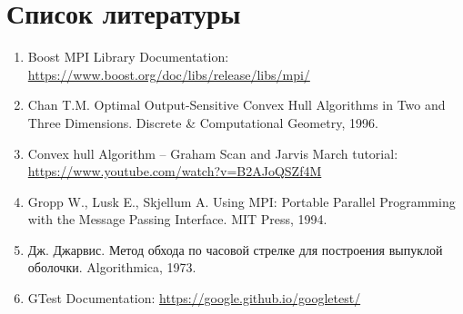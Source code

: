 \documentclass[a4paper,12pt]{article}
\begin{document}
\newpage

\section{Список литературы}
\begin{enumerate}
    \item Boost MPI Library Documentation: \url{https://www.boost.org/doc/libs/release/libs/mpi/}
    \item Chan T.M. Optimal Output-Sensitive Convex Hull Algorithms in Two and Three Dimensions. Discrete \& Computational Geometry, 1996.
    \item Convex hull Algorithm – Graham Scan and Jarvis March tutorial: \url{https://www.youtube.com/watch?v=B2AJoQSZf4M}
    \item Gropp W., Lusk E., Skjellum A. Using MPI: Portable Parallel Programming with the Message Passing Interface. MIT Press, 1994.
    \item Дж. Джарвис. Метод обхода по часовой стрелке для построения выпуклой оболочки. Algorithmica, 1973.
    \item GTest Documentation: \url{https://google.github.io/googletest/}
\end{enumerate}

\newpage

\end{document}
